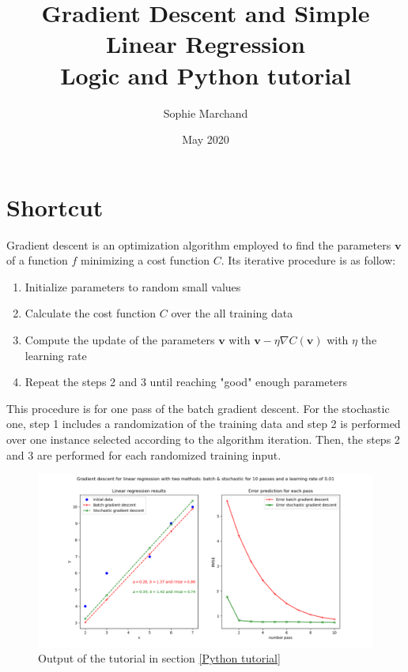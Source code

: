 \documentclass{article}
\title{Gradient Descent and Simple Linear Regression \\ Logic and Python tutorial}
\author{Sophie Marchand}
\date{May 2020}
\begin{document}
\maketitle

\section{Shortcut}
\begin{tcolorbox}
Gradient descent is an optimization algorithm employed to find the parameters \(\mathbf{v}\) of a function \(f\) minimizing a cost function \(C\). Its iterative procedure is as follow:
\begin{enumerate}
    \item Initialize parameters to random small values
    \item Calculate the cost function \(C\) over the all training data
    \item Compute the update of the parameters \(\mathbf{v}\) with \(\mathbf{v} - \eta\nabla C(\mathbf{v})\) with \(\eta\) the learning rate
    \item Repeat the steps 2 and 3 until reaching "good" enough parameters
\end{enumerate}
This procedure is for one pass of the batch gradient descent. For the stochastic one, step 1 includes a randomization of the training data and step 2 is performed over one instance selected according to the algorithm iteration. Then, the steps 2 and 3 are performed for each randomized training input.
\end{tcolorbox}

\begin{figure}[h]
\centering
\includegraphics[width=1.05\textwidth]{Figure_GradientDescentLinearRegression.png}
\caption{Output of the tutorial in section \ref{Python tutorial}}
\end{figure}
\end{document}
